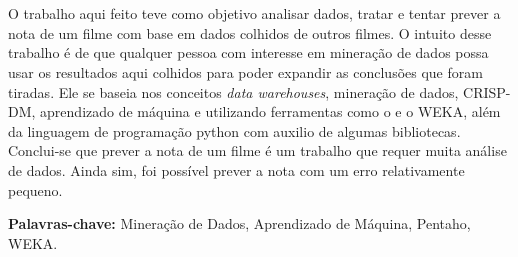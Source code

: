 \section*{}
O trabalho aqui feito teve como objetivo analisar dados, tratar e tentar prever a nota de um filme com base em dados colhidos de outros filmes. O intuito desse trabalho é de que qualquer pessoa com interesse em mineração de dados possa usar os resultados aqui colhidos para poder expandir as conclusões que foram tiradas. Ele se baseia nos conceitos \textit{data warehouses}, mineração de dados, CRISP-DM, aprendizado de máquina e utilizando ferramentas como o \pdi e o WEKA, além da linguagem de programação python com auxilio de algumas bibliotecas.
Conclui-se que prever a nota de um filme é um trabalho que requer muita análise de dados. Ainda sim, foi possível prever a nota com um erro relativamente pequeno.

{\bf Palavras-chave:} Mineração de Dados,  Aprendizado de Máquina, Pentaho, WEKA.